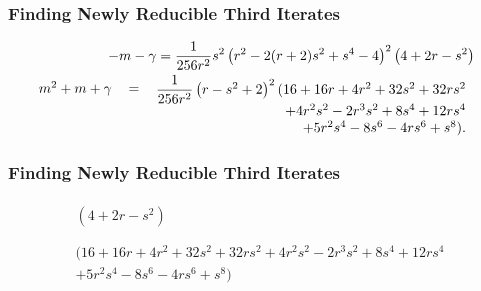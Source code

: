 \begin{frame}
	\frametitle{Finding Newly Reducible Third Iterates}
	\begin{align*}
		\begin{split}
			-m-\gamma &=  \frac{1}{256 r^2} s^2 \left(r^2-2 (r+2) s^2+s^4-4\right)^2\left(4 + 2 r - s^2\right)
		\end{split}\\
		\begin{split}
			\begin{tabular}{r}$m^2+m+\gamma$ \\ \vphantom{x} \\ \vphantom{x} \end{tabular} & \begin{tabular}{l}$=$\\ \vphantom{x} \\ \vphantom{x} \end{tabular} \begin{tabular}{r} $\dfrac{1}{256 r^2}\left(r-s^2+2\right)^2 (16 + 16 r + 4 r^2 + 32 s^2 + 32 r s^2$ \\ $ + 4 r^2 s^2 - 2 r^3 s^2 + 8 s^4 + 12 r s^4 $ \\ $ + 5 r^2 s^4 - 8 s^6 - 4 r s^6 + s^8).$ \end{tabular}
		\end{split}
	\end{align*}
\end{frame}

\begin{frame}
	\frametitle{Finding Newly Reducible Third Iterates}
	\begin{align*}
		\begin{split}
			\left(4 + 2 r - s^2\right) \\
			\phantom{x} \\
			(16 + 16 r + 4 r^2 + 32 s^2 + 32 r s^2 + 4 r^2 s^2 - 2 r^3 s^2 + 8 s^4 + 12 r s^4 \\ + 5 r^2 s^4 - 8 s^6 - 4 r s^6 + s^8)
		\end{split}
	\end{align*}
\end{frame}

